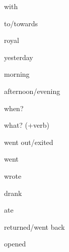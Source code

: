 \begin{flashcard}{\LARGE with}
\LARGE {}
\end{flashcard}
\begin{flashcard}{\LARGE to/towards}
\LARGE {}
\end{flashcard}
\begin{flashcard}{\LARGE royal}
\LARGE {}
\end{flashcard}
\begin{flashcard}{\LARGE yesterday}
\LARGE {}
\end{flashcard}
\begin{flashcard}{\LARGE morning}
\LARGE {}
\end{flashcard}
\begin{flashcard}{\LARGE afternoon/evening}
\LARGE {}
\end{flashcard}
\begin{flashcard}{\LARGE when?}
\LARGE {}
\end{flashcard}
\begin{flashcard}{\LARGE what? (+verb)}
\LARGE {}
\end{flashcard}
\begin{flashcard}{\LARGE went out/exited}
\LARGE {}
\end{flashcard}
\begin{flashcard}{\LARGE went}
\LARGE {}
\end{flashcard}
\begin{flashcard}{\LARGE wrote}
\LARGE {}
\end{flashcard}
\begin{flashcard}{\LARGE drank}
\LARGE {}
\end{flashcard}
\begin{flashcard}{\LARGE ate}
\LARGE {}
\end{flashcard}
\begin{flashcard}{\LARGE returned/went back}
\LARGE {}
\end{flashcard}
\begin{flashcard}{\LARGE opened}
\LARGE {}
\end{flashcard}
